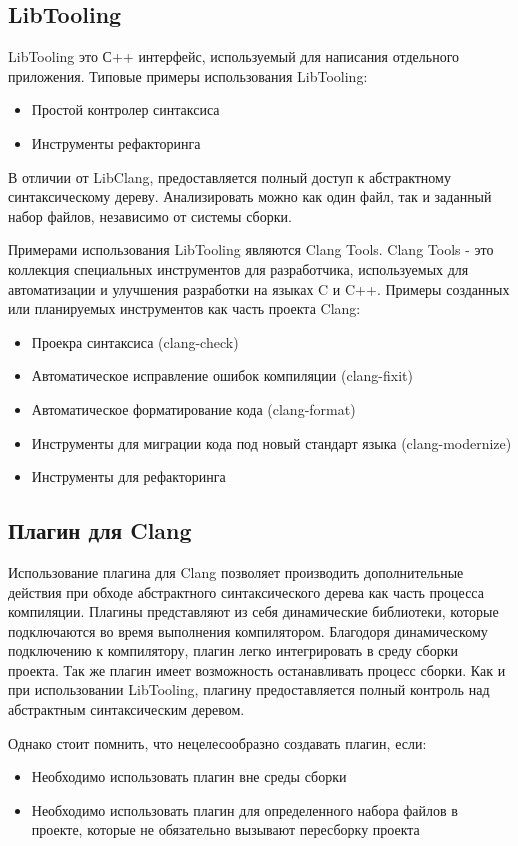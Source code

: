 \subsection*{LibTooling}
LibTooling это С++ интерфейс, используемый для написания отдельного приложения. Типовые примеры использования
LibTooling:
\begin{itemize}
	\item Простой контролер синтаксиса
	\item Инструменты рефакторинга
\end{itemize}
 
В отличии от LibClang, предоставляется полный доступ к абстрактному синтаксическому дереву. 
Анализировать можно как один файл, так и заданный набор файлов, независимо от системы сборки.

Примерами использования LibTooling являются Clang Tools. Clang Tools - это коллекция специальных 
инструментов для разработчика, используемых для автоматизации и улучшения разработки на языках C и C++.
Примеры созданных или планируемых инструментов как часть проекта Clang:
\begin{itemize}
	\item Проекра синтаксиса (clang-check)
	\item Автоматическое исправление ошибок компиляции (clang-fixit)
	\item Автоматическое форматирование кода (clang-format)
	\item Инструменты для миграции кода под новый стандарт языка (clang-modernize)
	\item Инструменты для рефакторинга
\end{itemize}

\subsection*{Плагин для Clang}
Использование плагина для Clang позволяет производить дополнительные действия при обходе абстрактного 
синтаксического дерева как часть процесса компиляции. Плагины представляют из себя динамические
библиотеки, которые подключаются во время выполнения компилятором. Благодоря динамическому подключению 
к компилятору, плагин легко интегрировать в среду сборки проекта. Так же плагин имеет возможность 
останавливать процесс сборки. Как и при использовании LibTooling, плагину предоставляется полный
контроль над абстрактным синтаксическим деревом.
 
Однако стоит помнить, что нецелесообразно создавать плагин, если:
\begin{itemize}
	\item Необходимо использовать плагин вне среды сборки
	\item Необходимо использовать плагин для определенного набора файлов в проекте, которые 
не обязательно вызывают пересборку проекта
\end{itemize}

